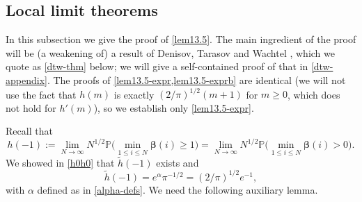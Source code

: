\documentclass[11pt,reqno]{amsart}
\numberwithin{equation}{section}
\theoremstyle{definition}
\theoremstyle{remark}
\newcommand{\mb}{\mathbb}
\def\boldbeta{\boldsymbol\beta}
\renewcommand{\le}{\leqslant}
\renewcommand{\ge}{\geqslant}
\begin{document}
\subsection{Local limit theorems} \label{loc-lim-thm-app} In this subsection we give the proof of \cref{lem13.5}. The main ingredient of the proof will be (a weakening of) a result of Denisov, Tarasov and Wachtel \cite{DTW24b}, which we quote as \cref{dtw-thm} below; we will give a self-contained proof of that in \cref{dtw-appendix}. The proofs of \cref{lem13.5-expr,lem13.5-exprb} are identical (we will not use the fact that $h(m)$ is exactly $(2/\pi)^{1/2}(m + 1)$ for $m \ge 0$, which does not hold for $h'(m)$), so we establish only \cref{lem13.5-expr}. 

Recall that 
\[ h(-1) := \lim_{N \rightarrow \infty} N^{1/2} \mb{P} \big(\min_{1 \le i \le N} \boldbeta(i) \ge 1\big) = \lim_{N \rightarrow \infty} N^{1/2} \mb{P} \big(\min_{1 \le i \le N} \boldbeta(i) > 0\big).\] We showed in \cref{h0h0} that $\tilde h(-1)$ exists and 
\begin{equation}\label{h0-tilde-val} \tilde h(-1) = e^{\alpha} \pi^{-1/2} = (2/\pi)^{1/2} e^{-1},\end{equation} with $\alpha$ defined as in \cref{alpha-defs}. We need the following auxiliary lemma.
\end{document}
